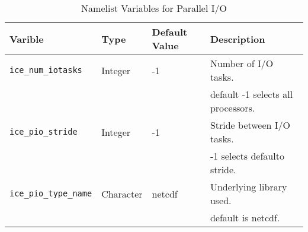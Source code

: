 \begin{table}
  \begin{center}
  \caption{Namelist Variables for Parallel I/O}
  \label{table:pio_nml}
  \begin{tabular}{p{2.5cm}p{2.5cm}p{3cm}p{6.0cm}} \hline
  Varible & Type & Default Value & Description               \\
\hline \hline

{\tt ice\_num\_iotasks} & Integer & -1 & Number of I/O tasks. \\
                        &         &    & default -1 selects all processors. \\

{\tt ice\_pio\_stride} & Integer & -1 & Stride between I/O tasks. \\
                        &        &    & -1 selects defaulto stride. \\

{\tt ice\_pio\_type\_name} & Character & netcdf & Underlying library used. \\
                        &        &     & default is netcdf. \\

  \hline
  \end{tabular}
  \end{center}
\end{table}
